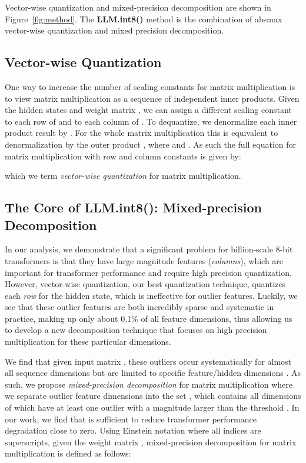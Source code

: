 \documentclass{article}
\begin{document}
Vector-wise quantization and mixed-precision decomposition are shown in Figure~\ref{fig:method}. The {\bf LLM.int8()} method is the combination of absmax vector-wise quantization and mixed precision decomposition. 

\subsection{Vector-wise Quantization}

One way to increase the number of scaling constants for matrix multiplication is to view matrix multiplication as a sequence of independent inner products. Given the hidden states  and weight matrix , we can assign a different scaling constant to each row of  and  to each column of . To dequantize, we denormalize each inner product result by . For the whole matrix multiplication this is equivalent to denormalization by the outer product , where  and . As such the full equation for matrix multiplication with row and column constants is given by:

which we term {\it vector-wise quantization} for matrix multiplication.

\subsection{The Core of LLM.int8(): Mixed-precision Decomposition}

In our analysis, we demonstrate that a significant problem for billion-scale 8-bit transformers is that they have large magnitude features ({\it columns}), which are important for transformer performance and require high precision quantization. However, vector-wise quantization, our best quantization technique, quantizes each {\it row} for the hidden state, which is ineffective for outlier features. Luckily, we see that these outlier features are both incredibly sparse and systematic in practice, making up only about 0.1\% of all feature dimensions, thus allowing us to develop a new decomposition technique that focuses on high precision multiplication for these particular dimensions.

We find that given input matrix , these outliers occur systematically for almost all sequence dimensions  but are limited to specific feature/hidden dimensions . As such, we propose {\it mixed-precision decomposition} for matrix multiplication where we separate outlier feature dimensions into the set , which contains all dimensions of  which have at least one outlier with a magnitude larger than the threshold . In our work, we find that  is sufficient to reduce transformer performance degradation close to zero. Using Einstein notation where all indices are superscripts, given the weight matrix , mixed-precision decomposition for matrix multiplication is defined as follows:
\end{document}
